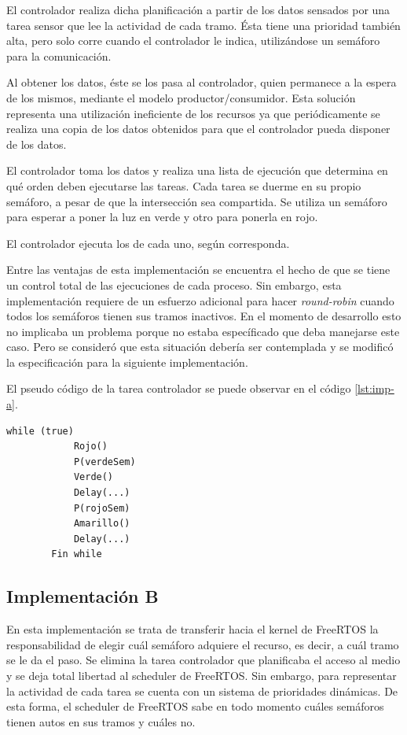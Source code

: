 	El controlador realiza dicha planificación a partir de los datos sensados por una tarea sensor que lee la actividad de cada tramo.
	Ésta tiene una prioridad también alta, pero solo corre cuando el controlador le indica, utilizándose un semáforo para la comunicación.

	Al obtener los datos, éste se los pasa al controlador, quien permanece a la espera de los mismos, mediante el modelo productor/consumidor.
	Esta solución representa una utilización ineficiente de los recursos ya que periódicamente se realiza una copia de los datos obtenidos para que el controlador pueda disponer de los datos.

	El controlador toma los datos y realiza una lista de ejecución que determina en qué orden deben ejecutarse las tareas.
	Cada tarea se duerme en su propio semáforo, a pesar de que la intersección sea compartida.
	Se utiliza un semáforo para esperar a poner la luz en verde y otro para ponerla en rojo.

	El controlador ejecuta los  de cada uno, según corresponda.

	Entre las ventajas de esta implementación se encuentra el hecho de que se tiene un control total de las ejecuciones de cada proceso.
	Sin embargo, esta implementación requiere de un esfuerzo adicional para hacer \emph{round-robin} cuando todos los semáforos tienen sus tramos inactivos. En el momento de desarrollo esto no implicaba un problema porque no estaba específicado que deba manejarse este caso. Pero se consideró que esta situación debería ser contemplada y se modificó la especificación para la siguiente implementación.

	El pseudo código de la tarea controlador se puede observar en el código \ref{lst:imp-a}.

	\begin{lstlisting}[float, label=lst:imp-a, caption=Pseudocódigo de la tarea controlador.]
		while (true)
			Rojo()
			P(verdeSem)
			Verde()
			Delay(...)
			P(rojoSem)
			Amarillo()
			Delay(...)
		Fin while
	\end{lstlisting}



	\subsection{Implementación B}

	En esta implementación se trata de transferir hacia el kernel de FreeRTOS la responsabilidad de elegir cuál semáforo adquiere el recurso, es decir, a cuál tramo se le da el paso.
	Se elimina la tarea controlador que planificaba el acceso al medio y se deja total libertad al scheduler de FreeRTOS.
	Sin embargo, para representar la actividad de cada tarea se cuenta con un sistema de prioridades dinámicas.
	De esta forma, el scheduler de FreeRTOS sabe en todo momento cuáles semáforos tienen autos en sus tramos y cuáles no.

